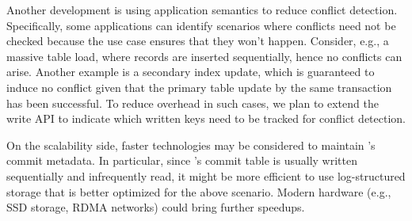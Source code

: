 Another development %
is using application semantics to reduce conflict detection. Specifically, some applications can identify scenarios where conflicts 
need not be checked because the use case ensures that they won't happen. Consider, e.g., a massive table load, where records 
are inserted sequentially, hence no conflicts can arise. Another example is a secondary index update, which is guaranteed
to induce no conflict given that the primary table update by the same transaction has been successful. 
To reduce overhead in such cases, we plan to extend the write API to indicate which written keys need
to be tracked for conflict detection. 

On the scalability side, faster technologies may be considered to maintain \sys's commit metadata.  In particular, since \sys's commit table 
is usually written sequentially and infrequently read, it might be more efficient to use log-structured storage that is better optimized for the 
above scenario. Modern hardware (e.g., SSD storage, RDMA networks)  could bring further speedups. 


